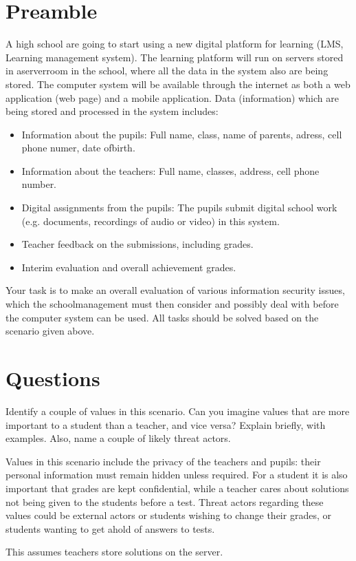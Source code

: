 \documentclass{myassignment}
\begin{document}
	\section{Preamble}
	\begin{problem}
		A high school are going to start using a new digital platform for learning (LMS, Learning management system). The learning platform will run on servers stored in aserverroom in the school, where all the data in the system also are being stored. The computer system will be available through the internet as both a web application (web page) and a mobile application. Data (information) which are being stored and processed in the system includes:%
		\begin{itemize}%
			\item Information about the pupils: Full name, class, name of parents, adress, cell phone numer, date ofbirth.%
			\item Information about the teachers: Full name, classes, address, cell phone number.%
			\item Digital assignments from the pupils: The pupils submit digital school work (e.g. documents, recordings of audio or video) in this system.%
			\item Teacher feedback on the submissions, including grades.%
			\item Interim evaluation and overall achievement grades.%
		\end{itemize}
		Your task is to make an overall evaluation of various information security issues, which the schoolmanagement must then consider and possibly deal with before the computer system can be used. All tasks should be solved based on the scenario given above.
	\end{problem}

	\section{Questions}
	\begin{problem}
		Identify a couple of values in this scenario. Can you imagine values that are more important to a student than a teacher, and vice versa? Explain briefly, with examples. Also, name a couple of likely threat actors.%
	\end{problem}

	\begin{answer}
		Values in this scenario include the privacy of the teachers and pupils: their personal information must remain hidden unless required. For a student it is also important that grades are kept confidential, while a teacher cares about solutions not being given to the students before a test. Threat actors regarding these values could be external actors or students wishing to change their grades, or students wanting to get ahold of answers to tests. 

		This assumes teachers store solutions on the server.
	\end{answer}
\end{document}
